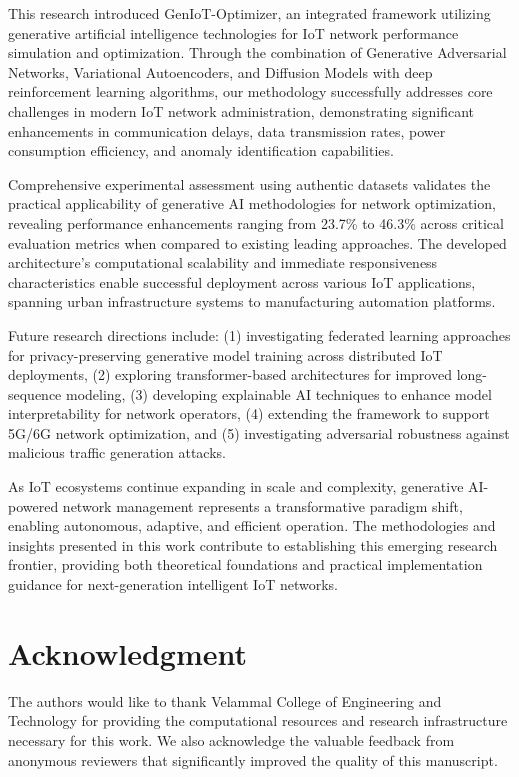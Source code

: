 \documentclass[conference]{IEEEtran}
\begin{document}
This research introduced GenIoT-Optimizer, an integrated framework utilizing generative artificial intelligence technologies for IoT network performance simulation and optimization. Through the combination of Generative Adversarial Networks, Variational Autoencoders, and Diffusion Models with deep reinforcement learning algorithms, our methodology successfully addresses core challenges in modern IoT network administration, demonstrating significant enhancements in communication delays, data transmission rates, power consumption efficiency, and anomaly identification capabilities.

Comprehensive experimental assessment using authentic datasets validates the practical applicability of generative AI methodologies for network optimization, revealing performance enhancements ranging from 23.7\% to 46.3\% across critical evaluation metrics when compared to existing leading approaches. The developed architecture's computational scalability and immediate responsiveness characteristics enable successful deployment across various IoT applications, spanning urban infrastructure systems to manufacturing automation platforms.

Future research directions include: (1) investigating federated learning approaches for privacy-preserving generative model training across distributed IoT deployments, (2) exploring transformer-based architectures for improved long-sequence modeling, (3) developing explainable AI techniques to enhance model interpretability for network operators, (4) extending the framework to support 5G/6G network optimization, and (5) investigating adversarial robustness against malicious traffic generation attacks.

As IoT ecosystems continue expanding in scale and complexity, generative AI-powered network management represents a transformative paradigm shift, enabling autonomous, adaptive, and efficient operation. The methodologies and insights presented in this work contribute to establishing this emerging research frontier, providing both theoretical foundations and practical implementation guidance for next-generation intelligent IoT networks.

\section*{Acknowledgment}

The authors would like to thank Velammal College of Engineering and Technology for providing the computational resources and research infrastructure necessary for this work. We also acknowledge the valuable feedback from anonymous reviewers that significantly improved the quality of this manuscript.
\end{document}
